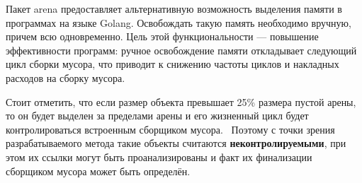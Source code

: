 
Пакет arena предоставляет альтернативную возможность выделения памяти в программах на языке Golang. Освобождать такую память необходимо вручную, причем всю одновременно. Цель этой функциональности --- повышение эффективности программ: ручное освобождение памяти откладывает следующий цикл сборки мусора, что приводит к снижению частоты циклов и накладных расходов на сборку мусора.~\cite{golang_arena_source}




Стоит отметить, что если размер объекта превышает 25\% размера пустой арены, то он будет выделен за пределами арены и его жизненный цикл будет контролироваться встроенным сборщиком мусора.~\cite{golang_arena_limits} Поэтому с точки зрения разрабатываемого метода такие объекты считаются \textbf{неконтролируемыми}, при этом их ссылки могут быть проанализированы и факт их финализации сборщиком мусора может быть определён.

